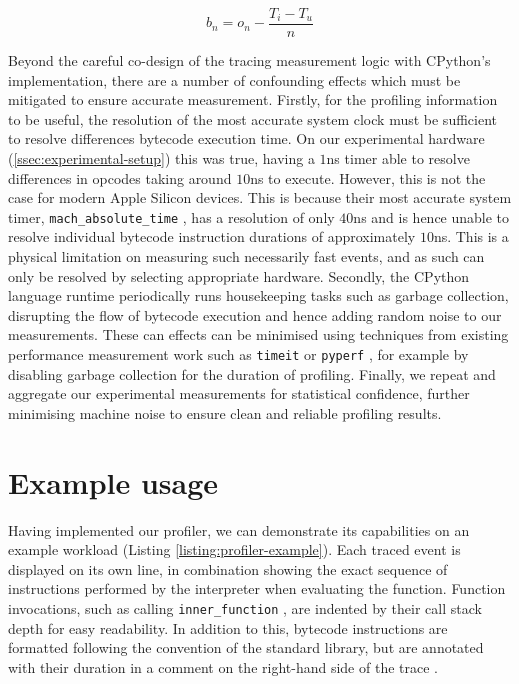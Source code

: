 \begin{equation}
    \label{eq:3}
    b_n = o_n - \frac{T_i - T_u}{n}
\end{equation}

Beyond the careful co-design of the tracing measurement logic with CPython's implementation, there are a number of confounding effects which must be mitigated to ensure accurate measurement.
Firstly, for the profiling information to be useful, the resolution of the most accurate system clock must be sufficient to resolve differences bytecode execution time. On our experimental hardware (\autoref{ssec:experimental-setup}) this was true, having a $1$ns timer able to resolve differences in opcodes taking around $10$ns to execute. However, this is not the case for modern Apple Silicon devices. This is because their most accurate system timer, \texttt{mach\_absolute\_time} \cite{appleinc.Mach_absolute_time}, has a resolution of only $40$ns and is hence unable to resolve individual bytecode instruction durations of approximately $10$ns. This is a physical limitation on measuring such necessarily fast events, and as such can only be resolved by selecting appropriate hardware.
Secondly, the CPython language runtime periodically runs housekeeping tasks such as garbage collection, disrupting the flow of bytecode execution and hence adding random noise to our measurements. These can effects can be minimised using techniques from existing performance measurement work such as \texttt{timeit} \cite{pythonsoftwarefoundationTimeitMeasureExecution} or \texttt{pyperf} \cite{victorstinnerPsfPyperf2025}, for example by disabling garbage collection for the duration of profiling.
Finally, we repeat and aggregate our experimental measurements for statistical confidence, further minimising machine noise to ensure clean and reliable profiling results.


\section{Example usage}
\label{sec:profiling-bytecode-examples}

Having implemented our profiler, we can demonstrate its capabilities on an example workload (Listing \ref{listing:profiler-example}).
Each traced event is displayed on its own line, in combination showing the exact sequence of instructions performed by the interpreter when evaluating the function. Function invocations, such as calling \texttt{inner\_function} , are indented by their call stack depth for easy readability. In addition to this, bytecode instructions are formatted following the convention of the standard library, but are annotated with their duration in a comment on the right-hand side of the trace .


